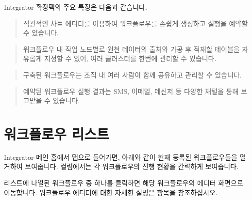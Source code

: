 \documentclass[letterpaper,10pt,english]{sphinxmanual}
\begin{document}
Integrator 확장팩의 주요 특징은 다음과 같습니다.

\begin{quote}

직관적인 차트 에디터를 이용하여 워크플로우를 손쉽게 생성하고 실행을 예약할 수 있습니다.
\end{quote}

\begin{quote}

워크플로우 내 작업 노드별로 원천 데이터의 출처와 가공 후 적재할 테이블을 자유롭게 지정할 수 있어, 여러 클러스터를 한번에 관리할 수 있습니다.
\end{quote}

\begin{quote}

구축된 워크플로우는 조직 내 여러 사람이 함께 공유하고 관리할 수 있습니다.
\end{quote}

\begin{quote}

예약된 워크플로우 실행 결과는 SMS, 이메일, 메신저 등 다양한 채털을 통해 보고받을 수 있습니다.
\end{quote}


\chapter{워크플로우 리스트}
\label{\detokenize{integrator/part02/index:workflow-list}}\label{\detokenize{integrator/part02/index:id1}}\label{\detokenize{integrator/part02/index::doc}}
Integrator 메인 홈에서  탭으로 들어가면, 아래와 같이 현재 등록된 워크플로우들을 열거하여 보여줍니다.
 컬럼에서는 각 워크플로우의 진행 현황을 간략하게 보여줍니다.
\begin{quote}

\begin{figure}[H]
\centering

\noindent{}
\end{figure}
\end{quote}

리스트에 나열된 워크플로우 중 하나를 클릭하면 해당 워크플로우의 에디터 화면으로 이동합니다. 워크플로우 에디터에 대한 자세한 설명은 {\hyperref[\detokenize{integrator/part03/index:workflow-editor}]{}} 항목을 참조하십시오.
\end{document}
